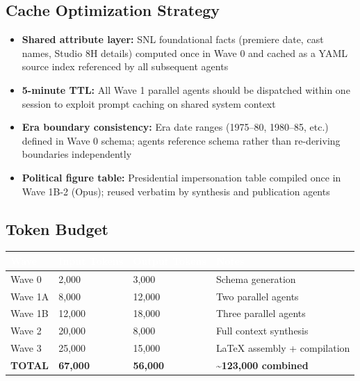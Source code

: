\documentclass[11pt,letterpaper]{article}
\newcommand{\tableheader}[1]{\textbf{\sffamily\textcolor{white}{#1}}}
\begin{document}
\subsection{Cache Optimization Strategy}

\begin{itemize}[noitemsep]
  \item \textbf{Shared attribute layer:} SNL foundational facts (premiere date, cast names, Studio 8H details) computed once in Wave 0 and cached as a YAML source index referenced by all subsequent agents
  \item \textbf{5-minute TTL:} All Wave 1 parallel agents should be dispatched within one session to exploit prompt caching on shared system context
  \item \textbf{Era boundary consistency:} Era date ranges (1975--80, 1980--85, etc.) defined in Wave 0 schema; agents reference schema rather than re-deriving boundaries independently
  \item \textbf{Political figure table:} Presidential impersonation table compiled once in Wave 1B-2 (Opus); reused verbatim by synthesis and publication agents
\end{itemize}

\subsection{Token Budget}

\begin{center}
\begin{tabularx}{\textwidth}{L{3cm}C{3cm}C{3cm}X}
\toprule
{}
\tableheader{Wave} & \tableheader{Input Tokens} & \tableheader{Output Tokens} & \tableheader{Notes} \\
\midrule
Wave 0 & 2,000 & 3,000 & Schema generation \\
Wave 1A & 8,000 & 12,000 & Two parallel agents \\
Wave 1B & 12,000 & 18,000 & Three parallel agents \\
Wave 2 & 20,000 & 8,000 & Full context synthesis \\
Wave 3 & 25,000 & 15,000 & LaTeX assembly + compilation \\
\textbf{TOTAL} & \textbf{67,000} & \textbf{56,000} & \textbf{\textasciitilde{}123,000 combined} \\
\bottomrule
\end{tabularx}
\end{center}
\end{document}
